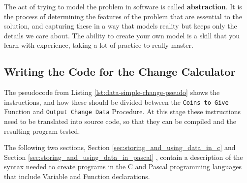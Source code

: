 The act of trying to model the problem in software is called \textbf{abstraction}. It is the process of determining the features of the problem that are essential to the solution, and capturing these in a way that models reality but keeps only the details we care about. The ability to create your own model is a skill that you learn with experience, taking a lot of practice to really master.



\clearpage
\subsection{Writing the Code for the Change Calculator} %
\label{sub:writing_the_code_for_simple_change}

The pseudocode from Listing \ref{lst:data-simple-change-pseudo} shows the instructions, and how these should be divided between the \texttt{Coins to Give} Function and \texttt{Output Change Data} Procedure. At this stage these instructions need to be translated into source code, so that they can be compiled and the resulting program tested.

The following two sections, Section \ref{sec:storing_and_using_data_in_c}  and Section \ref{sec:storing_and_using_data_in_pascal} , contain a description of the syntax needed to create programs in the C and Pascal programming languages that include Variable and Function declarations.


